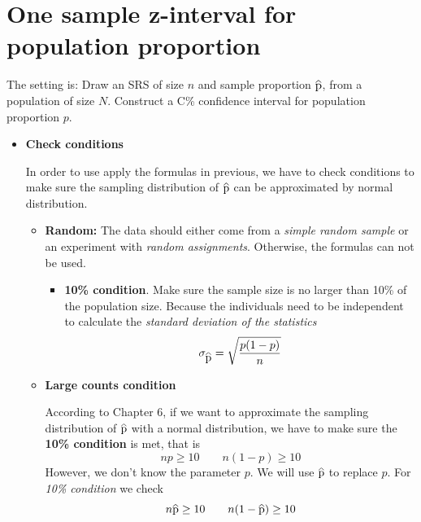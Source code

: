 \documentclass[a4paper, 12pt,twoside]{book}
\newcommand\reallywidehat[1]{%
\savestack{\tmpbox}{\stretchto{%
  \scaleto{%
    \scalerel*[\widthof{\ensuremath{#1}}]{\kern-.6pt\bigwedge\kern-.6pt}%
    {\rule[-\textheight/2]{1ex}{\textheight}}%
  }{\textheight}%
}{0.5ex}}%
\stackon[1pt]{#1}{\tmpbox}%
}
\begin{document}
\section{One sample z-interval for population proportion}


The setting is: Draw an SRS of size $n$ and sample proportion $\reallywidehat{p}$, from a population of size $N$. Construct a C\% confidence interval for population proportion $p$. 
\vspace{0.6cm}
   
\begin{itemize}   
  \item \textbf{Check conditions}\vspace{0.3cm}
   
      In order to use apply the formulas in previous, we have to check conditions to make sure the sampling distribution of $\reallywidehat{p}$ can be approximated by normal distribution.\vspace{0.3cm}
      
   \begin{itemize}[leftmargin = 0.5cm]
       \item \textbf{Random:} The data should either come from a \textit{simple random sample} or an experiment with \textit{random assignments}. Otherwise, the formulas can not be used.\vspace{0.3cm}
       
       \begin{itemize}[leftmargin = 1cm]
           \item \textbf{10\% condition}. Make sure the sample size is no larger than 10\% of the population size. Because the individuals need to be independent to calculate the \textit{standard deviation of the statistics}
           $$\sigma_{\reallywidehat{p}} = \sqrt{\frac{p(1-p)}{n}}$$
         
       \end{itemize}
    \item \textbf{Large counts condition} \vspace{0.3cm}
    
       According to Chapter 6, if we want to approximate the sampling distribution of $\reallywidehat{p}$ with a normal distribution, we have to make sure the \textbf{10\% condition} is met, that is 
       $$np \geq 10 \qquad n(1-p) \geq 10$$ 
  However, we don't know the parameter $p$. We will use $\reallywidehat{p}$ to replace $p$. For \textit{10\% condition} we check 
      $$n\reallywidehat{p} \geq 10 \qquad n(1-\reallywidehat{p}) \geq 10$$
             

\end{itemize}
\end{itemize}
\end{document}
